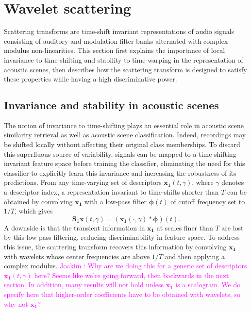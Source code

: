 \documentclass[journal]{IEEEtran}
\newcommand{\ja}[1]{\textcolor{magenta}{Joakim : #1}}
\begin{document}


\section{Wavelet scattering \label{sec:scattering}}

Scattering transforms are time-shift invariant representations of audio signals consisting of auditory and modulation filter banks alternated with complex modulus non-linearities.
This section first explains the importance of local invariance to time-shifting and stability to time-warping in the representation of acoustic scenes, then describes how the scattering transform is designed to satisfy these properties while having a high discriminative power.

\subsection{Invariance and stability in acoustic scenes}
The notion of invariance to time-shifting plays an essential role in acoustic scene similarity retrieval as well as acoustic scene classification.
Indeed, recordings may be shifted locally without affecting their original class memberships.
To discard this superfluous source of variability, signals can be mapped to a time-shifting invariant feature space before training the classifier, eliminating the need for this classifier to explicitly learn this invariance and increasing the robustness of its predictions.
From any time-varying set of descriptors $\boldsymbol{x_1}(t,\gamma)$, where $\gamma$ denotes a descriptor index, a representation invariant to time-shifts shorter than $T$ can be obtained by convolving $\boldsymbol{x_1}$ with a low-pass filter $\boldsymbol{\phi}(t)$ of cutoff frequency set to $1/T$, which gives
\begin{equation}
\mathbf{S_1}\boldsymbol{x}(t, \gamma) = (\boldsymbol{x_1}(\cdot,\gamma) \ast \boldsymbol{\phi}) (t).
\end{equation}
A downside is that the transient information in $\boldsymbol{x_1}$ at scales finer than $T$ are lost by this low-pass filtering, reducing discriminability in feature space.
To address this issue, the scattering transform recovers this information by convolving $\boldsymbol{x_1}$ with wavelets whose center frequencies are above $1/T$ and then applying a complex modulus. \ja{Why are we doing this for a generic set of descriptors $\boldsymbol{x_1}(t, \gamma)$ here? Seems like we're going forward, then backwards in the next section. In addition, many results will not hold unless $\boldsymbol{x_1}$ is a scalogram. We do specify here that higher-order coefficients have to be obtained with wavelets, so why not $\boldsymbol{x_1}$?}
\end{document}
